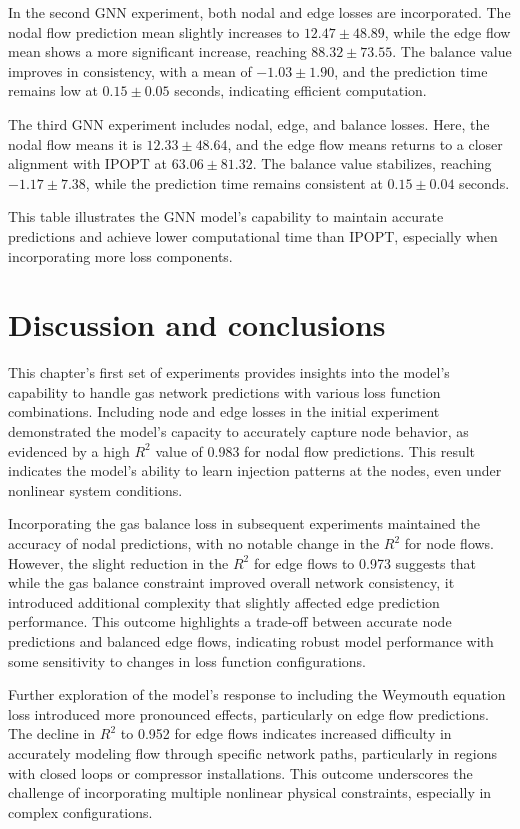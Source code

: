 In the second GNN experiment, both nodal and edge losses are incorporated. The nodal flow prediction mean slightly increases to \( 12.47 \pm 48.89 \), while the edge flow mean shows a more significant increase, reaching \( 88.32 \pm 73.55 \). The balance value improves in consistency, with a mean of \( -1.03 \pm 1.90 \), and the prediction time remains low at \( 0.15 \pm 0.05 \) seconds, indicating efficient computation.

The third GNN experiment includes nodal, edge, and balance losses. Here, the nodal flow means it is \( 12.33 \pm 48.64 \), and the edge flow means returns to a closer alignment with IPOPT at \( 63.06 \pm 81.32 \). The balance value stabilizes, reaching \( -1.17 \pm 7.38 \), while the prediction time remains consistent at \( 0.15 \pm 0.04 \) seconds.

This table illustrates the GNN model's capability to maintain accurate predictions and achieve lower computational time than IPOPT, especially when incorporating more loss components.



\section{Discussion and conclusions}


This chapter's first set of experiments provides insights into the model's capability to handle gas network predictions with various loss function combinations. Including node and edge losses in the initial experiment demonstrated the model's capacity to accurately capture node behavior, as evidenced by a high $R^2$ value of 0.983 for nodal flow predictions. This result indicates the model's ability to learn injection patterns at the nodes, even under nonlinear system conditions.

Incorporating the gas balance loss in subsequent experiments maintained the accuracy of nodal predictions, with no notable change in the $R^2$ for node flows. However, the slight reduction in the $R^2$ for edge flows to 0.973 suggests that while the gas balance constraint improved overall network consistency, it introduced additional complexity that slightly affected edge prediction performance. This outcome highlights a trade-off between accurate node predictions and balanced edge flows, indicating robust model performance with some sensitivity to changes in loss function configurations.

Further exploration of the model's response to including the Weymouth equation loss introduced more pronounced effects, particularly on edge flow predictions. The decline in $R^2$ to 0.952 for edge flows indicates increased difficulty in accurately modeling flow through specific network paths, particularly in regions with closed loops or compressor installations. This outcome underscores the challenge of incorporating multiple nonlinear physical constraints, especially in complex configurations.

